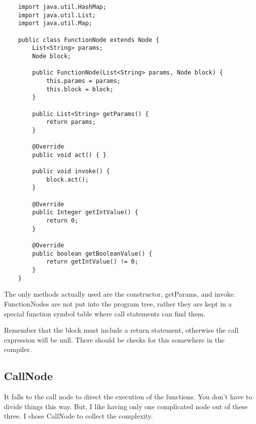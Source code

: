 {\footnotesize
\begin{verbatim}
    import java.util.HashMap;
    import java.util.List;
    import java.util.Map;
    
    public class FunctionNode extends Node {
        List<String> params;
        Node block;
    
        public FunctionNode(List<String> params, Node block) {
            this.params = params;
            this.block = block;
        }
    
        public List<String> getParams() {
            return params;
        }
    
        @Override
        public void act() { }
    
        public void invoke() {
            block.act();
        }
    
        @Override
        public Integer getIntValue() {
            return 0;
        }
    
        @Override
        public boolean getBooleanValue() {
            return getIntValue() != 0;
        }
    }
\end{verbatim}
}

The only methods actually used are the constructor, getParams, and
invoke. FunctionNodes are not put into the program tree, rather
they are kept in a special function symbol table where call statements
can find them.

Remember that the block must include a return statement, otherwise the
call expression will be null. There should be checks for this
somewhere in the compiler.

\subsection{CallNode}

It falls to the call node to direct the execution of the functions.
You don't have to divide things this way. But, I like having only
one complicated node out of these three. I chose CallNode to collect
the complexity.

